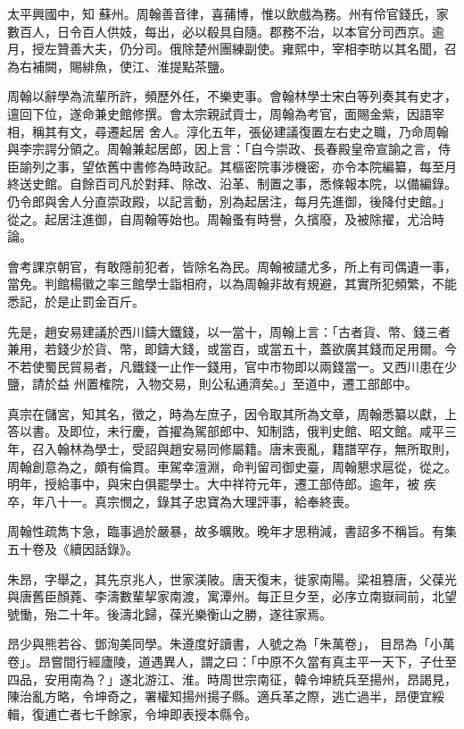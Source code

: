 \begin{pinyinscope}
 太平興國中，知
 蘇州。周翰善音律，喜蒱博，惟以飲戲為務。州有伶官錢氏，家數百人，日令百人供妓，每出，必以殽具自隨。郡務不治，以本官分司西京。逾月，授左贊善大夫，仍分司。俄除楚州團練副使。雍熙中，宰相李昉以其名聞，召為右補闕，賜緋魚，使江、淮提點茶鹽。



 周翰以辭學為流輩所許，頻歷外任，不樂吏事。會翰林學士宋白等列奏其有史才，邅回下位，遂命兼史館修撰。會太宗親試貢士，周翰為考官，面賜金紫，因語宰相，稱其有文，尋遷起居
 舍人。淳化五年，張佖建議復置左右史之職，乃命周翰與李宗諤分領之。周翰兼起居郎，因上言：「自今崇政、長春殿皇帝宣諭之言，侍臣諭列之事，望依舊中書修為時政記。其樞密院事涉機密，亦令本院編纂，每至月終送史館。自餘百司凡於對拜、除改、沿革、制置之事，悉條報本院，以備編錄。仍令郎與舍人分直崇政殿，以記言動，別為起居注，每月先進御，後降付史館。」從之。起居注進御，自周翰等始也。周翰蚤有時譽，久擯廢，及被除擢，尤洽時
 論。



 會考課京朝官，有敢隱前犯者，皆除名為民。周翰被譴尤多，所上有司偶遺一事，當免。判館楊徽之率三館學士詣相府，以為周翰非故有規避，其實所犯頻繁，不能悉記，於是止罰金百斤。



 先是，趙安易建議於西川鑄大鐵錢，以一當十，周翰上言：「古者貨、幣、錢三者兼用，若錢少於貨、幣，即鑄大錢，或當百，或當五十，蓋欲廣其錢而足用爾。今不若使蜀民貿易者，凡鐵錢一止作一錢用，官中市物即以兩錢當一。又西川患在少鹽，請於益
 州置榷院，入物交易，則公私通濟矣。」至道中，遷工部郎中。



 真宗在儲宮，知其名，徵之，時為左庶子，因令取其所為文章，周翰悉纂以獻，上答以書。及即位，未行慶，首擢為駕部郎中、知制誥，俄判史館、昭文館。咸平三年，召入翰林為學士，受詔與趙安易同修屬籍。唐末喪亂，籍譜罕存，無所取則，周翰創意為之，頗有倫貫。車駕幸澶淵，命判留司御史臺，周翰懇求扈從，從之。明年，授給事中，與宋白俱罷學士。大中祥符元年，遷工部侍郎。逾年，被
 疾卒，年八十一。真宗憫之，錄其子忠寶為大理評事，給奉終喪。



 周翰性疏雋卞急，臨事過於嚴暴，故多曠敗。晚年才思稍減，書詔多不稱旨。有集五十卷及《續因話錄》。



 朱昂，字舉之，其先京兆人，世家渼陂。唐天復末，徙家南陽。梁祖篡唐，父葆光與唐舊臣顏蕘、李濤數輩挈家南渡，寓潭州。每正旦夕至，必序立南嶽祠前，北望號慟，殆二十年。後濤北歸，葆光樂衡山之勝，遂往家焉。



 昂少與熊若谷、鄧洵美同學。朱遵度好讀書，人號之為「朱萬卷」，
 目昂為「小萬卷」。昂嘗間行經廬陵，道遇異人，謂之曰：「中原不久當有真主平一天下，子仕至四品，安用南為？」遂北游江、淮。時周世宗南征，韓令坤統兵至揚州，昂謁見，陳治亂方略，令坤奇之，署權知揚州揚子縣。適兵革之際，逃亡過半，昂便宜綏輯，復逋亡者七千餘家，令坤即表授本縣令。




\end{pinyinscope}
